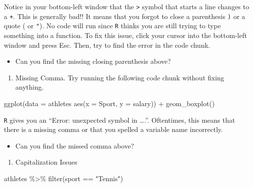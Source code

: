\documentclass[
]{book}
\newenvironment{Shaded}{\begin{snugshade}}{\end{snugshade}}
\newcommand{\AttributeTok}[1]{\textcolor[rgb]{0.77,0.63,0.00}{#1}}
\newcommand{\FunctionTok}[1]{\textcolor[rgb]{0.00,0.00,0.00}{#1}}
\newcommand{\NormalTok}[1]{#1}
\newcommand{\SpecialCharTok}[1]{\textcolor[rgb]{0.00,0.00,0.00}{#1}}
\newcommand{\StringTok}[1]{\textcolor[rgb]{0.31,0.60,0.02}{#1}}
\providecommand{\tightlist}{%
  \setlength{\itemsep}{0pt}\setlength{\parskip}{0pt}}
\begin{document}
Notice in your bottom-left window that the \texttt{\textgreater{}} symbol that starts a line changes to a \texttt{+}. This is generally bad!! It means that you forgot to close a parenthesis \texttt{)} or a quote (\texttt{\textquotesingle{}} or \texttt{"}). No code will run since \texttt{R} thinks you are still trying to type something into a function. To fix this issue, click your cursor into the bottom-left window and press Esc. Then, try to find the error in the code chunk.

\begin{itemize}
\tightlist
\item
  Can you find the missing closing parenthesis above?
\end{itemize}

\begin{enumerate}
\def\labelenumi{\arabic{enumi}.}
\setcounter{enumi}{1}
\tightlist
\item
  Missing Comma. Try running the following code chunk without fixing anything.
\end{enumerate}

\begin{Shaded}
\begin{Highlighting}[]
\FunctionTok{ggplot}\NormalTok{(}\AttributeTok{data =}\NormalTok{ athletes }\FunctionTok{aes}\NormalTok{(}\AttributeTok{x =}\NormalTok{ Sport, }\AttributeTok{y =}\NormalTok{ salary)) }\SpecialCharTok{+} 
  \FunctionTok{geom\_boxplot}\NormalTok{()}
\end{Highlighting}
\end{Shaded}

\texttt{R} gives you an ``Error: unexpected symbol in \ldots.''. Oftentimes, this means that there is a missing comma or that you spelled a variable name incorrectly.

\begin{itemize}
\tightlist
\item
  Can you find the missed comma above?
\end{itemize}

\begin{enumerate}
\def\labelenumi{\arabic{enumi}.}
\setcounter{enumi}{2}
\tightlist
\item
  Capitalization Issues
\end{enumerate}

\begin{Shaded}
\begin{Highlighting}[]
\NormalTok{athletes }\SpecialCharTok{\%\textgreater{}\%} \FunctionTok{filter}\NormalTok{(sport }\SpecialCharTok{==} \StringTok{"Tennis"}\NormalTok{)}
\end{Highlighting}
\end{Shaded}
\end{document}
